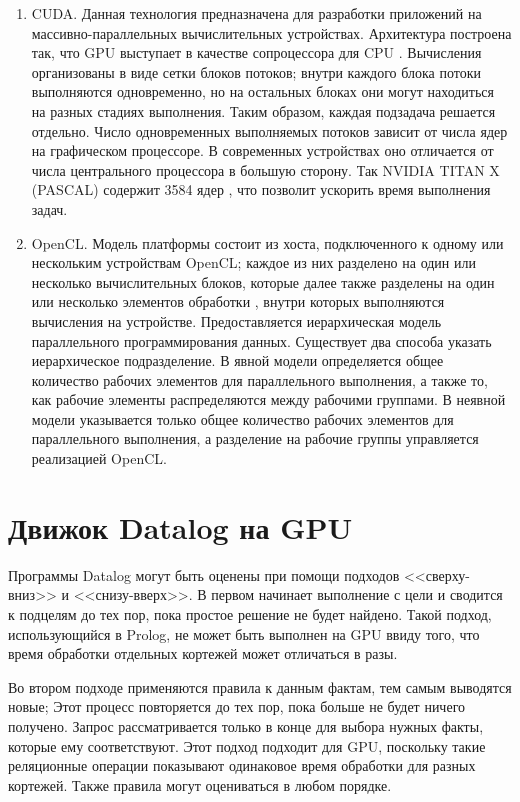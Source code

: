 \begin{enumerate}
	\item CUDA. Данная технология предназначена для разработки приложений на массивно-параллельных вычислительных устройствах. Архитектура построена так, что GPU выступает в качестве сопроцессора для CPU \cite{cuda}.	Вычисления организованы в виде сетки блоков потоков; внутри каждого блока потоки выполняются одновременно, но на остальных блоках они могут находиться на разных стадиях выполнения. Таким образом, каждая подзадача решается отдельно. Число одновременных выполняемых потоков зависит от числа ядер на графическом процессоре. В современных устройствах оно отличается от числа центрального процессора в большую сторону. Так NVIDIA TITAN X (PASCAL) содержит 3584 ядер \cite{nvidia_titan_x}, что позволит ускорить время выполнения задач.	
	
	\item OpenCL. Модель платформы состоит из хоста, подключенного к одному или нескольким устройствам OpenCL; каждое из них разделено на один или несколько вычислительных блоков, которые далее также разделены на один или несколько элементов обработки \cite{opencl}, внутри которых выполняются вычисления на устройстве. Предоставляется иерархическая модель параллельного программирования данных. Существует два способа указать иерархическое подразделение. В явной модели определяется общее количество рабочих элементов для параллельного выполнения, а также то, как рабочие элементы распределяются между рабочими группами. В неявной модели указывается только общее количество рабочих элементов для параллельного выполнения, а разделение на рабочие группы управляется реализацией OpenCL.
\end{enumerate}


\section{Движок Datalog на GPU}
Программы Datalog могут быть оценены при помощи подходов <<сверху-вниз>> и <<снизу-вверх>>. В первом начинает выполнение с цели и сводится к подцелям до тех пор, пока простое решение не будет найдено. Такой подход, использующийся в Prolog, не может быть выполнен на GPU ввиду того, что время обработки отдельных кортежей может отличаться в разы.

Во втором подходе применяются правила к данным фактам, тем самым выводятся новые; Этот процесс повторяется до тех пор, пока больше не будет ничего получено. Запрос рассматривается только в конце для выбора нужных факты, которые ему соответствуют. Этот подход подходит для GPU, поскольку такие реляционные операции показывают одинаковое время обработки для разных кортежей. Также правила могут оцениваться в любом порядке.

